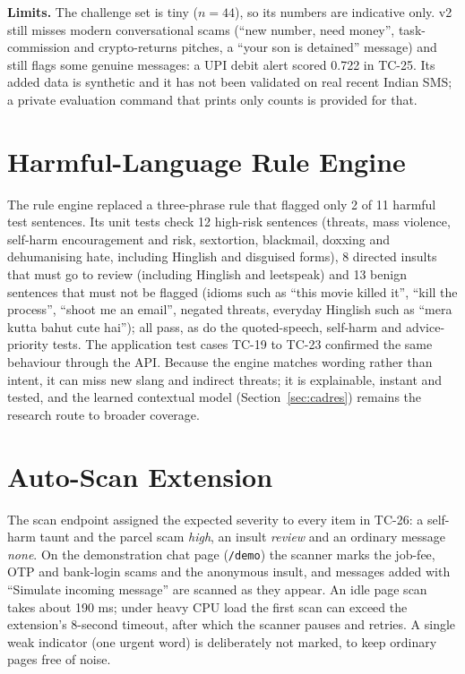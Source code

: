 \noindent\textbf{Limits.} The challenge set is tiny ($n=44$), so its numbers are indicative only. v2 still misses modern conversational scams (``new number, need money'', task-commission and crypto-returns pitches, a ``your son is detained'' message) and still flags some genuine messages: a UPI debit alert scored 0.722 in TC-25. Its added data is synthetic and it has not been validated on real recent Indian SMS; a private evaluation command that prints only counts is provided for that.

\section{Harmful-Language Rule Engine}
\noindent The rule engine replaced a three-phrase rule that flagged only 2 of 11 harmful test sentences. Its unit tests check 12 high-risk sentences (threats, mass violence, self-harm encouragement and risk, sextortion, blackmail, doxxing and dehumanising hate, including Hinglish and disguised forms), 8 directed insults that must go to review (including Hinglish and leetspeak) and 13 benign sentences that must not be flagged (idioms such as ``this movie killed it'', ``kill the process'', ``shoot me an email'', negated threats, everyday Hinglish such as ``mera kutta bahut cute hai''); all pass, as do the quoted-speech, self-harm and advice-priority tests. The application test cases TC-19 to TC-23 confirmed the same behaviour through the API. Because the engine matches wording rather than intent, it can miss new slang and indirect threats; it is explainable, instant and tested, and the learned contextual model (Section~\ref{sec:cadres}) remains the research route to broader coverage.

\section{Auto-Scan Extension}
\noindent The scan endpoint assigned the expected severity to every item in TC-26: a self-harm taunt and the parcel scam \emph{high}, an insult \emph{review} and an ordinary message \emph{none}. On the demonstration chat page (\texttt{/demo}) the scanner marks the job-fee, OTP and bank-login scams and the anonymous insult, and messages added with ``Simulate incoming message'' are scanned as they appear. An idle page scan takes about 190 ms; under heavy CPU load the first scan can exceed the extension's 8-second timeout, after which the scanner pauses and retries. A single weak indicator (one urgent word) is deliberately not marked, to keep ordinary pages free of noise.

